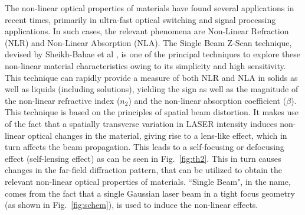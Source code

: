 \documentclass[%
 reprint,
amsmath,
amssymb,
10pt
]{revtex4-2}
\begin{document}
The non-linear optical properties of materials have found several applications in recent times, primarily in ultra-fast optical switching and signal processing applications. In such cases, the relevant phenomena are Non-Linear Refraction (NLR) and Non-Linear Absorption (NLA). The Single Beam Z-Scan technique, devised by Sheikh-Bahae et al \cite{bahae}, is one of the principal techniques to explore these non-linear material characteristics owing to its simplicity and high sensitivity. This technique can rapidly provide a measure of both NLR and NLA in solids as well as liquids (including solutions), yielding the sign as well as the magnitude of the non-linear refractive index ($n_2$) and the non-linear absorption coefficient ($\beta$). This technique is based on the principles of spatial beam distortion. It makes use of the fact that a spatially transverse variation in LASER intensity induces non-linear optical changes in the material, giving rise to a lens-like effect, which in turn affects the beam propagation. This leads to a self-focusing or defocusing effect (self-lensing effect) as can be seen in Fig.~\ref{fig:th2}. This in turn causes changes in the far-field diffraction pattern, that can be utilized to obtain the relevant non-linear optical properties of materials. ``Single Beam", in the name, comes from the fact that a single Gaussian laser beam in a tight focus geometry (as shown in Fig.~\ref{fig:schem}), is used to induce the non-linear effects.\\
\end{document}
